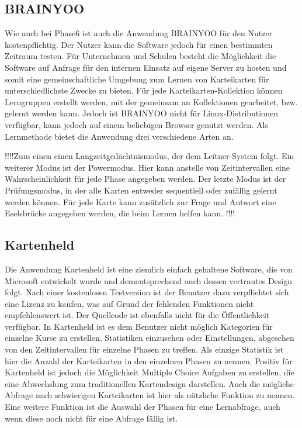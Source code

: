 \subsection{BRAINYOO}
Wie auch bei Phase6 ist auch die Anwendung BRAINYOO \cite{brainyoo} für den Nutzer kostenpflichtig. Der Nutzer kann die Software jedoch für einen bestimmten Zeitraum testen. Für Unternehmen und Schulen besteht die Möglichkeit die Software auf Anfrage für den internen Einsatz auf eigene Server zu hosten und somit eine gemeinschaftliche Umgebung zum Lernen von Karteikarten für unterschiedlichste Zwecke zu bieten. Für jede Karteikarten-Kollektion können Lerngruppen erstellt werden, mit der gemeinsam an Kollektionen gearbeitet, bzw. gelernt werden kann. Jedoch ist BRAINYOO nicht für Linux-Distributionen verfügbar, kann jedoch auf einem beliebigen Browser genutzt werden. Als Lernmethode bietet die Anwendung drei verschiedene Arten an. 

!!!!Zum einen einen Langzeitgedächtnismodus, der dem Leitner-System folgt. Ein weiterer Modus ist der Powermodus. Hier kann anstelle von Zeitintervallen eine Wahrscheinlichkeit für jede Phase angegeben werden. Der letzte Modus ist der Prüfungsmodus, in der alle Karten entweder sequentiell oder zufällig gelernt werden können. Für jede Karte kann zusätzlich zur Frage und Antwort eine Eselsbrücke angegeben werden, die beim Lernen helfen kann. !!!!

\subsection{Kartenheld}
Die Anwendung Kartenheld \cite{kartenheld} ist eine ziemlich einfach gehaltene Software, die von Microsoft entwickelt wurde und dementsprechend auch dessen vertrautes Design folgt. Nach einer kostenlosen Testversion ist der Benutzer dazu verpflichtet sich eine Lizenz zu kaufen, was auf Grund der fehlenden Funktionen nicht empfehlenswert ist. Der Quellcode ist ebenfalls nicht für die Öffentlichkeit verfügbar. In Kartenheld ist es dem Benutzer nicht möglich Kategorien für einzelne Kurse zu erstellen, Statistiken einzusehen oder Einstellungen, abgesehen von den Zeitintervallen für einzelne Phasen zu treffen. Als einzige Statistik ist hier die Anzahl der Karteikarten in den einzelnen Phasen zu nennen. Positiv für Kartenheld ist jedoch die Möglichkeit Multiple Choice Aufgaben zu erstellen, die eine Abwechslung zum traditionellen Kartendesign darstellen. Auch die mögliche Abfrage nach schwierigen Karteikarten ist hier als nützliche Funktion zu nennen. Eine weitere Funktion ist die Auswahl der Phasen für eine Lernabfrage, auch wenn diese noch nicht für eine Abfrage fällig ist.

